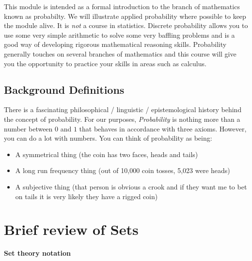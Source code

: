 \documentclass{book}
\begin{document}
This module is intended as a formal introduction to the branch of mathematics known as probabilty.   We will illustrate applied probability where possible to keep the module alive.   It is \emph{not} a course in statistics.   Discrete probability allows you to use some very simple arithmetic to solve some very baffling problems and is a good way of developing rigorous mathematical reasoning skills.   Probability generally touches on several branches of mathematics and this course will give you the opportunity to practice your skills in areas such as calculus.

\section{Background Definitions}

There is a fascinating philosophical / linguistic / epistemological history behind the concept of probability.   For our purposes, \emph{Probability} is nothing more than a number between $0$ and $1$ that behaves in accordance with three axioms.   However, you can do a lot with numbers.   You can think of probability as being:

\begin{itemize}
\item A symmetrical thing (the coin has two faces, heads and tails)
\item A long run frequency thing (out of 10,000 coin tosses, 5,023 were heads)
\item A subjective thing (that person is obvious a crook and if they want me to bet on tails it is very likely they have a rigged coin)
\end{itemize}




\chapter{Brief review of Sets}






\subsubsection{Set theory notation}

 
\end{document}

